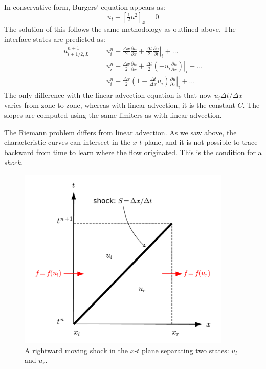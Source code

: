 In conservative form, Burgers' equation appears as:
\begin{equation}
u_t + \left [\tfrac{1}{2} u^2 \right ]_x = 0
\end{equation}
The solution of this follows the same methodology as outlined above.
The interface states are predicted as:
\begin{eqnarray}
u^{n+1}_{i+1/2,L} 
 &=& u^n_i + \frac{\Delta x}{2} \frac{\partial u}{\partial x}
    + \frac{\Delta t}{2} \left . \frac{\partial u}{\partial t} \right |_i
    + \ldots \\
 &=& u^n_i + \frac{\Delta x}{2} \frac{\partial u}{\partial x}
    + \frac{\Delta t}{2} \left . \left (-u_i \frac{\partial u}{\partial x} 
         \right ) \right |_i 
    + \ldots \\
 &=& u^n_i + \frac{\Delta x}{2} 
   \left ( 1 - \frac{\Delta t}{\Delta x} u_i \right ) 
   \left . \frac{\partial u}{\partial x} \right |_i + \ldots
\end{eqnarray}
The only difference with the linear advection equation is that now
$u_i \Delta t/\Delta x$ varies from zone to zone, whereas with linear
advection, it is the constant $C$.  The slopes are computed using
the same limiters as with linear advection. 

The Riemann problem differs from linear advection.  As we saw above,
the characteristic curves can intersect in the $x$-$t$ plane, and it
is not possible to trace backward from time to learn where the flow
originated.  This is the condition for a {\em shock}.

\begin{figure}[t]
\centering
\includegraphics[width=4in]{rh}
\caption[Rankine-Hugoniot conditions]{\label{fig:rh} A rightward moving shock in the $x$-$t$
   plane separating two states: $u_l$ and $u_r$.}
\end{figure}

